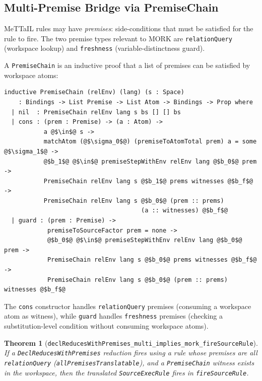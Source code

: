 \documentclass[11pt]{article}
\newtheorem{theorem}{Theorem}[section]
\theoremstyle{definition}
\theoremstyle{remark}
\newcommand{\MORK}{\textup{MORK}}
\newcommand{\MeTTaIL}{\textup{MeTTaIL}}
\begin{document}
\subsection{Multi-Premise Bridge via PremiseChain}

\MeTTaIL{} rules may have \emph{premises}: side-conditions that must be
satisfied for the rule to fire.  The two premise types relevant to \MORK{}
are \texttt{relationQuery} (workspace lookup) and \texttt{freshness}
(variable-distinctness guard).

A \texttt{PremiseChain} is an inductive proof that a list of premises
can be satisfied by workspace atoms:

\begin{lstlisting}[caption={PremiseChain inductive type.}]
inductive PremiseChain (relEnv) (lang) (s : Space)
    : Bindings -> List Premise -> List Atom -> Bindings -> Prop where
  | nil  : PremiseChain relEnv lang s bs [] [] bs
  | cons : (prem : Premise) -> (a : Atom) ->
           a @$\in$@ s ->
           matchAtom (@$\sigma_0$@) (premiseToAtomTotal prem) a = some @$\sigma_1$@ ->
           @$b_1$@ @$\in$@ premiseStepWithEnv relEnv lang @$b_0$@ prem ->
           PremiseChain relEnv lang s @$b_1$@ prems witnesses @$b_f$@ ->
           PremiseChain relEnv lang s @$b_0$@ (prem :: prems)
                                      (a :: witnesses) @$b_f$@
  | guard : (prem : Premise) ->
            premiseToSourceFactor prem = none ->
            @$b_0$@ @$\in$@ premiseStepWithEnv relEnv lang @$b_0$@ prem ->
            PremiseChain relEnv lang s @$b_0$@ prems witnesses @$b_f$@ ->
            PremiseChain relEnv lang s @$b_0$@ (prem :: prems) witnesses @$b_f$@
\end{lstlisting}

\noindent
The \texttt{cons} constructor handles \texttt{relationQuery} premises
(consuming a workspace atom as witness), while \texttt{guard} handles
\texttt{freshness} premises (checking a substitution-level condition without
consuming workspace atoms).

\begin{theorem}[\texttt{declReducesWithPremises\_multi\_implies\_mork\_fireSourceRule}]
\label{thm:multibridge}
If a \texttt{DeclReducesWithPremises} reduction fires using a rule whose
premises are all \texttt{relationQuery} (\texttt{allPremisesTranslatable}),
and a \texttt{PremiseChain} witness exists in the workspace, then the
translated \texttt{SourceExecRule} fires in \texttt{fireSourceRule}.
\end{theorem}
\end{document}
